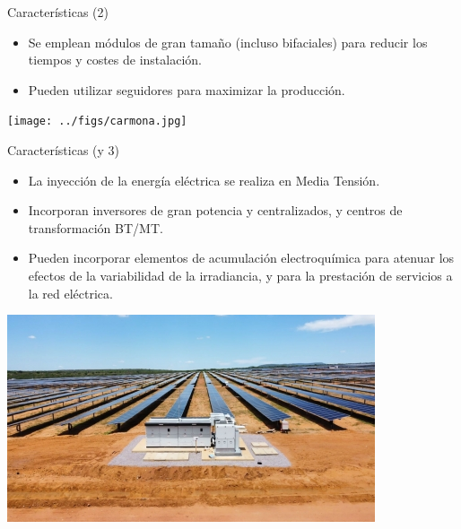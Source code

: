 \documentclass[aspectratio=169, usenames,svgnames,dvipsnames]{beamer}
\begin{document}
\begin{frame}[label={sec:org9dbd947}]{Características (2)}
\begin{itemize}
\item Se emplean \alert{módulos de gran tamaño} (incluso bifaciales) para reducir los tiempos y costes de instalación.
\item Pueden utilizar \alert{seguidores} para maximizar la producción.
\end{itemize}

\begin{center}
\texttt{[image: ../figs/carmona.jpg]}
\end{center}
\end{frame}

\begin{frame}[label={sec:org9f49608}]{Características (y 3)}
\begin{itemize}
\item La inyección de la energía eléctrica se realiza en \alert{Media Tensión}.
\item Incorporan \alert{inversores de gran potencia} y centralizados, y centros de transformación BT/MT.
\item Pueden incorporar \alert{elementos de acumulación electroquímica} para atenuar los efectos de la variabilidad de la irradiancia, y para la prestación de servicios a la red eléctrica.
\end{itemize}

\begin{center}
\includegraphics[height=0.5\textheight]{../figs/1power_station_de_ingeteam_en_la_planta_pv_bon_nome.jpg}
\end{center}
\end{frame}
\end{document}

